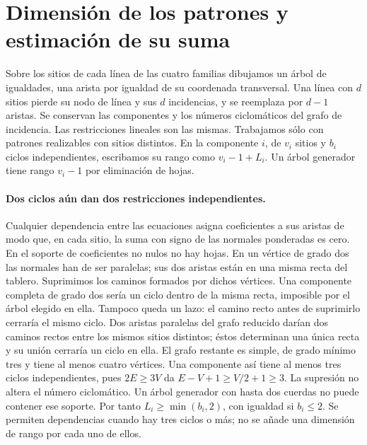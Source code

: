 \section{Dimensión de los patrones y estimación de su suma}
Sobre los sitios de cada línea de las cuatro familias dibujamos un árbol de igualdades,
una arista por igualdad de su coordenada transversal. Una línea con $d$ sitios pierde
su nodo de línea y sus $d$ incidencias, y se reemplaza por $d-1$ aristas. Se conservan
las componentes y los números ciclomáticos del grafo de incidencia. Las restricciones
lineales son las mismas. Trabajamos sólo con patrones realizables con sitios distintos.
En la componente $i$, de $v_i$ sitios y $b_i$ ciclos independientes, escribamos su
rango como $v_i-1+L_i$. Un árbol generador tiene rango $v_i-1$ por eliminación de hojas.

\paragraph{Dos ciclos aún dan dos restricciones independientes.}
Cualquier dependencia entre las ecuaciones asigna coeficientes a sus aristas de modo
que, en cada sitio, la suma con signo de las normales ponderadas es cero.
En el soporte de coeficientes no nulos no hay hojas. En un vértice de grado dos las
normales han de ser paralelas; sus dos aristas están en una misma recta del tablero.
Suprimimos los caminos formados por dichos vértices. Una componente completa de grado
dos sería un ciclo dentro de la misma recta, imposible por el árbol elegido en ella.
Tampoco queda un lazo: el camino recto antes de suprimirlo cerraría el mismo ciclo.
Dos aristas paralelas del grafo reducido darían dos caminos rectos entre los mismos
sitios distintos; éstos determinan una única recta y su unión cerraría un ciclo en ella.
El grafo restante es simple, de grado mínimo tres y tiene al menos cuatro vértices.
Una componente así tiene al menos tres ciclos independientes, pues $2E\ge3V$ da
$E-V+1\ge V/2+1\ge3$. La supresión no altera el número ciclomático.
Un árbol generador con hasta dos cuerdas no puede contener ese soporte. Por tanto
$L_i\ge\min(b_i,2)$, con igualdad si $b_i\le2$. Se permiten dependencias cuando
hay tres ciclos o más; no se añade una dimensión de rango por cada uno de ellos.

